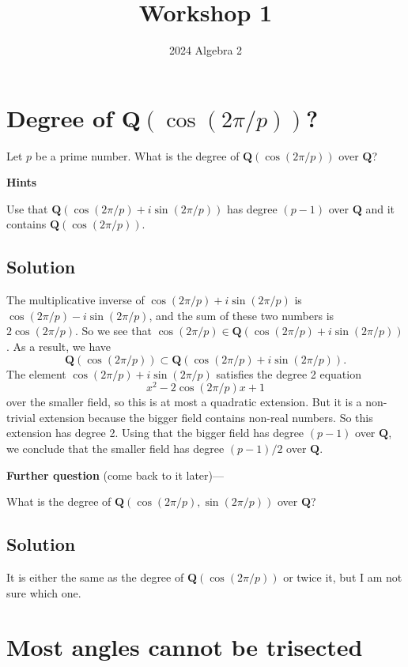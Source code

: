 \documentclass[12pt]{amsart}
\author{2024 Algebra 2}
\date{}
\title{Workshop 1}
\begin{document}
\maketitle
\section{Degree of \(\mathbf{Q}(\cos (2\pi/p))\)?}
\label{sec:org8b72f22}

\noindent
Let \(p\) be a prime number.
What is the degree of \(\mathbf{Q}(\cos (2\pi/p))\) over \(\mathbf{Q}\)?

\bigskip

\noindent
\textbf{\textbf{Hints}}

Use that \(\mathbf{Q}(\cos(2\pi/p) + i \sin(2\pi/p))\) has degree \((p-1)\) over \(\mathbf{Q}\) and it contains \(\mathbf{Q}(\cos(2\pi/p))\).
\subsection*{Solution}
\label{sec:orge2e9568}
The multiplicative inverse of \(\cos(2\pi/p) + i \sin(2\pi/p)\) is \(\cos(2\pi/p) - i \sin(2\pi/p)\), and the sum of these two numbers is \(2\cos(2\pi/p)\).
So we see that \(\cos(2\pi/p) \in \mathbf{Q}(\cos(2\pi/p) + i \sin(2\pi/p))\).
As a result, we have
\[ \mathbf{Q}(\cos(2\pi/p)) \subset \mathbf{Q}(\cos(2\pi/p) + i \sin(2\pi/p)).\]
The element \(\cos(2\pi/p) + i \sin(2\pi/p)\) satisfies the degree 2 equation
\[ x^2 - 2\cos(2\pi/p)x + 1\]
over the smaller field, so this is at most a quadratic extension.
But it is a non-trivial extension because the bigger field contains non-real numbers.
So this extension has degree 2.
Using that the bigger field has degree \((p-1)\) over \(\mathbf{Q}\), we conclude that the smaller field has degree \((p-1)/2\) over \(\mathbf{Q}\).

\textbf{\textbf{Further question}} (come back to it later)---

What is the degree of \(\mathbf{Q}(\cos (2\pi/p), \sin(2\pi/p))\) over \(\mathbf{Q}\)?
\subsection*{Solution}
\label{sec:orgbd12f26}
It is either the same as the degree of \(\mathbf{Q}(\cos (2\pi/p))\) or twice it, but I am not sure which one.
\section{Most angles cannot be trisected}
\label{sec:orgeb44034}
\end{document}
